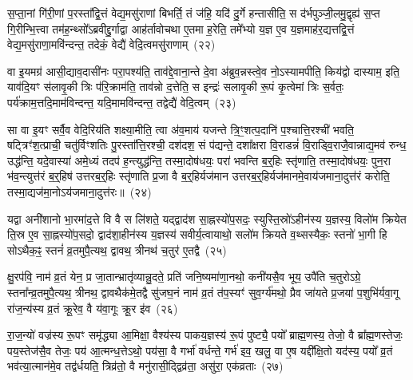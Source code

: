 स॒प्ता॒नां गि॑री॒णां प॒रस्ता᳚द्वि॒त्तं वेद्य॒मसु॑राणां बिभर्ति॒ तं ज॑हि॒ यदि॑ दु॒र्गे हन्तासीति॒ स द॑र्भपुञ्जी॒लमु॒द्वृह्य॑ स॒प्त गि॒रीन्भि॒त्त्वा तम॑ह॒न्थ्सो᳚\-ऽब्रवीद्दु॒र्गाद्वा आह॑र्तावोचथा ए॒तमा ह॒रेति॒ तमे᳚भ्यो य॒ज्ञ ए॒व य॒ज्ञमाह॑र॒द्यत्तद्वि॒त्तं वेद्य॒मसु॑राणा॒मवि॑न्दन्त॒ तदेकं॒ वेद्यै॑ वेदि॒त्वमसु॑राणाम्~(२२)

वा इ॒यमग्र॑ आसी॒द्याव॒दासी॑नः परा॒पश्य॑ति॒ ताव॑द्दे॒वाना॒न्ते दे॒वा अ॑ब्रुव॒न्नस्त्वे॒व नो॒\-ऽस्यामपीति॒ किय॑द्वो दास्याम॒ इति॒ याव॑दि॒यꣳ स॑लावृ॒की त्रिः प॑रि॒क्राम॑ति॒ ताव॑न्नो द॒त्तेति॒ स इन्द्रः॑ सलावृ॒की रू॒पं कृ॒त्वेमां त्रिः स॒र्वतः॒ पर्य॑क्राम॒त्तदि॒माम॑विन्दन्त॒ यदि॒मामवि॑न्दन्त॒ तद्वेद्यै॑ वेदि॒त्वम्~(२३)

सा वा इ॒यꣳ सर्वै॒व वेदि॒रिय॑ति शक्ष्या॒मीति॒ त्वा अ॑व॒माय॑ यजन्ते त्रि॒ꣳ॒शत्प॒दानि॑ प॒श्चात्ति॒रश्ची॑ भवति॒ षट्त्रिꣳ॑श॒त्प्राची॒ चतु॑र्विꣳशतिः पु॒रस्ता᳚त्ति॒रश्ची॒ दश॑दश॒ सं प॑द्यन्ते॒ दशा᳚क्षरा वि॒राडन्नं॑ वि॒राड्वि॒राजै॒वान्नाद्य॒मव॑ रुन्ध॒ उद्ध॑न्ति॒ यदे॒वास्या॑ अमे॒ध्यं तदप॑ ह॒न्त्युद्ध॑न्ति॒ तस्मा॒दोष॑धयः॒ परा॑ भवन्ति ब॒र्॒\mbox{}हिः स्तृ॑णाति॒ तस्मा॒दोष॑धयः॒ पुन॒रा भ॑व॒न्त्युत्त॑रं ब॒र्॒\mbox{}हिष॑ उत्तरब॒र्॒\mbox{}हिः स्तृ॑णाति प्र॒जा वै ब॒र्॒\mbox{}हिर्यज॑मान उत्तरब॒र्॒\mbox{}हिर्यज॑मानमे॒वाय॑जमाना॒दुत्त॑रं करोति॒ तस्मा॒द्यज॑मा॒नो\-ऽय॑जमाना॒दुत्त॑रः॥~(२४)

{}%

यद्वा अनी॑शानो भा॒रमा॑द॒त्ते वि वै स लि॑शते॒ यद्द्वाद॑श सा॒ह्नस्यो॑प॒सदः॒ स्युस्ति॒स्रो॑\-ऽहीन॑स्य य॒ज्ञस्य॒ विलो॑म क्रियेत ति॒स्र ए॒व सा॒ह्नस्यो॑प॒सदो॒ द्वाद॑शा॒हीन॑स्य य॒ज्ञस्य॑ सवीर्य॒त्वायाथो॒ सलो॑म क्रियते व॒थ्सस्यैकः॒ स्तनो॑ भा॒गी हि सो\-ऽथैक॒ꣴ॒ स्तनं॑ व्र॒तमुपै॒त्यथ॒ द्वावथ॒ त्रीनथ॑ च॒तुर॑ ए॒तद्वै~(२५)

क्षु॒रप॑वि॒ नाम॑ व्र॒तं येन॒ प्र जा॒तान्भ्रातृ॑व्यान्नु॒दते॒ प्रति॑ जनि॒ष्यमा॑णा॒नथो॒ कनी॑यसै॒व भूय॒ उपै॑ति च॒तुरो\-ऽग्रे॒ स्तना᳚न्व्र॒तमुपै॒त्यथ॒ त्रीनथ॒ द्वावथैक॑मे॒तद्वै सु॑जघ॒नं नाम॑ व्र॒तं त॑प॒स्यꣳ॑ सुव॒र्ग्य॑मथो॒ प्रैव जा॑यते प्र॒जया॑ प॒शुभि॑र्यवा॒गू रा॑ज॒न्य॑स्य व्र॒तं क्रू॒रेव॒ वै य॑वा॒गूः क्रू॒र इ॑व~(२६)

रा॒ज॒न्यो॑ वज्र॑स्य रू॒पꣳ समृ॑द्ध्या आ॒मिक्षा॒ वैश्य॑स्य पाकय॒ज्ञस्य॑ रू॒पं पुष्ट्यै॒ पयो᳚ ब्राह्म॒णस्य॒ तेजो॒ वै ब्रा᳚ह्म॒णस्तेजः॒ पय॒स्तेज॑सै॒व तेजः॒ पय॑ आ॒त्मन्ध॒त्ते\-ऽथो॒ पय॑सा॒ वै गर्भा॑ वर्धन्ते॒ गर्भ॑ इव॒ खलु॒ वा ए॒ष यद्दी᳚क्षि॒तो यद॑स्य॒ पयो᳚ व्र॒तं भव॑त्या॒त्मान॑मे॒व तद्व॑र्धयति॒ त्रिव्र॑तो॒ वै मनु॑रासी॒द्द्विव्र॑ता॒ असु॑रा॒ एक॑व्रताः~(२७)


